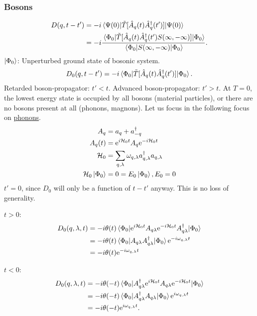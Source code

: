 \subsubsection{Bosons} %

\begin{align*} 
D(q, t-t') &= -i\ev{\tilde{T}[\hat{A}_q(t)\hat{A}_q^\dagger(t')]}{\Psi(0)} \\
&= -i\frac{\ev{\tilde{T}[\hat{A}_q(t)\hat{A}_q^\dagger(t')S(\infty, -\infty)]}{\Phi_0}}{\ev{S(\infty, -\infty)}{\Phi_0}}.
\end{align*}
$\ket{\Phi_0}$: Unperturbed ground state of bosonic system. 
\begin{equation} 
\label{eq:non_int_greens_boson}
D_0(q, t-t') = -i\ev{\tilde{T}[\hat{A}_q(t)\hat{A}_q^\dagger(t')]}{\Phi_0}.
\end{equation}
Retarded boson-propagator: $t'<t$. Advanced boson-propagator: $t'>t$. At $T = 0$, the lowest energy state is occupied by all bosons (material particles), or there are no bosons present at all (phonons, magnons).
Let us focus in the following focus on \underline{phonons}.
\begin{align*} 
A_q &= a_q + a_{-q}^\dagger \\
A_q(t) &= \mathrm{e}^{i\mathcal{H}_0 t}A_q\mathrm{e}^{-i\mathcal{H}_0t} \\
\mathcal{H}_0 &= \sum_{q, \lambda }\omega_{q, \lambda}a_{q,\lambda}^\dagger a_{q,\lambda} \\
\mathcal{H}_0\ket{\Phi_0} &= 0 = E_0\ket{\Phi_0}, E_0 = 0
\end{align*}
$t'=0$, since $D_0$ will only be a function of $t-t'$ anyway. This is no loss of generality.

\textbf{$t>0$}:
\begin{align} 
\begin{split} 
D_0(q, \lambda, t) &= -i\theta(t)\ev{\e^{i\Ha_0 t}A_{q\lambda}\e^{-i\Ha_0t}A_{q\lambda}^\dagger}{\Phi_0} \\
&= -i\theta(t)\ev{A_{q\lambda}A_{q\lambda}^\dagger}{\Phi_0}\e^{-i\omega_{q,\lambda}t}\\
&= -i\theta(t)\e^{-i\omega_{q, \lambda}t}
\end{split}
\end{align}

\textbf{$t<0$}:
\begin{align} 
\begin{split} 
D_0(q, \lambda, t) &= -i\theta(-t)\ev{A_{q\lambda}^\dagger\e^{i\Ha_0 t}A_{q\lambda}\e^{-i\Ha_0t}}{\Phi_0} \\
&= -i\theta(-t)\ev{A_{q\lambda}^\dagger A_{q\lambda}}{\Phi_0}\e^{i\omega_{q,\lambda}t}\\
&= -i\theta(-t)\e^{i\omega_{q, \lambda}t}.
\end{split}
\end{align}

